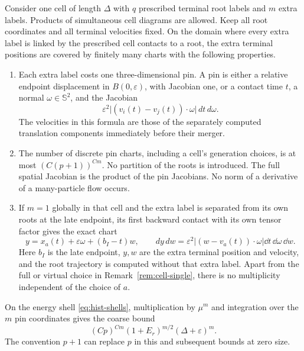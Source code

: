 \begin{lemma}
\label{hist:pinning}
Consider one cell of length $\Delta$ with $q$ prescribed terminal root
labels and $m$ extra labels.  Products of simultaneous cell diagrams
are allowed.  Keep all root coordinates and all terminal velocities
fixed.  On the domain where every extra label is linked by the
prescribed cell contacts to a root, the extra terminal positions are
covered by finitely many charts with the following properties.

\begin{enumerate}
\item Each extra label costs one three-dimensional pin.  A pin is
either a relative endpoint displacement in $B(0,\varepsilon)$, with
Jacobian one, or a contact time $t$, a normal $\omega\in\mathbb S^2$,
and the Jacobian
\begin{equation}
 \varepsilon^2
 \bigl|(v_i(t)-v_j(t))\cdot\omega\bigr|\,dt\,d\omega.
 \label{eq:hist-contact-jacobian}
\end{equation}
The velocities in this formula are those of the separately computed
translation components immediately before their merger.
\item The number of discrete pin charts, including a cell's generation
choices, is at most $(C(p+1))^{Cm}$.  No partition of the roots is
introduced.  The full spatial Jacobian is the product of the pin
Jacobians.  No norm of a derivative of a many-particle flow occurs.
\item If $m=1$ globally in that cell and the extra label is separated
from its own roots at the late endpoint, its first backward contact
with its own tensor factor gives the exact chart
\begin{equation}
 y=x_a(t)+\varepsilon\omega+(b_I-t)w,
 \qquad
 dy\,dw=\varepsilon^2|(w-v_a(t))\cdot\omega|
          \dd t\,\dd\omega\,\dd w .
 \label{eq:hist-single-chart}
\end{equation}
Here $b_I$ is the late endpoint, $y,w$ are the extra terminal position
and velocity, and the root trajectory is computed without that extra
label.  Apart from the full or virtual choice in
Remark~\ref{rem:cell-single}, there is no multiplicity independent of
the choice of $a$.
\end{enumerate}
On the energy shell \eqref{eq:hist-shells}, multiplication by
$\mu^m$ and integration over the $m$ pin coordinates gives the coarse
bound
\begin{equation}
 (Cp)^{Cm}(1+E_r)^{m/2}(\Delta+\varepsilon)^m.
 \label{eq:hist-multi-cell}
\end{equation}
The convention $p+1$ can replace $p$ in this and subsequent bounds at
zero size.
\end{lemma}

